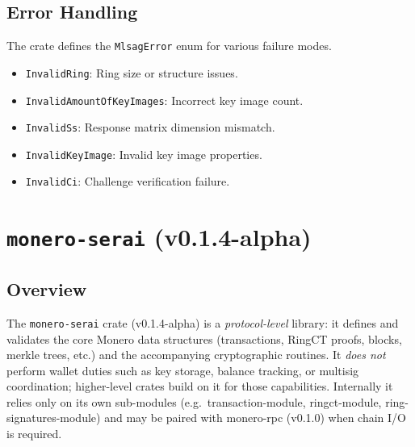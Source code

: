 \documentclass[12pt,a4paper]{article}
\begin{document}
\subsection{Error Handling}

The crate defines the \texttt{MlsagError} enum for various failure modes.
\begin{itemize}
\item \texttt{InvalidRing}: Ring size or structure issues.
\item \texttt{InvalidAmountOfKeyImages}: Incorrect key image count.
\item \texttt{InvalidSs}: Response matrix dimension mismatch.
\item \texttt{InvalidKeyImage}: Invalid key image properties.
\item \texttt{InvalidCi}: Challenge verification failure.
\end{itemize}



\section{\texttt{monero-serai} (v0.1.4-alpha)}
\label{sec:monero-serai}

\subsection*{Overview}

The \texttt{monero-serai} crate (v0.1.4-alpha) is a
\textit{protocol-level} library: it defines and validates the core
Monero data structures (transactions, RingCT proofs, blocks, merkle
trees, etc.) and the accompanying cryptographic routines.
It \emph{does not} perform wallet duties such as key storage, balance
tracking, or multisig coordination; higher-level crates build on it for
those capabilities.  Internally it relies only on its own sub-modules
(e.g.\ \gls{transaction-module}, \gls{ringct-module},
\gls{ring-signatures-module}) and may be paired with
\gls{monero-rpc (v0.1.0)} when chain I/O is required.
\end{document}
